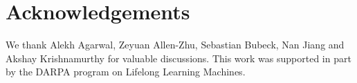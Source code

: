 \documentclass[11pt]{article}
\theoremstyle{definition}
\begin{document}










% 



\section*{Acknowledgements}
We thank Alekh Agarwal, Zeyuan Allen-Zhu, Sebastian Bubeck, Nan Jiang and Akshay Krishnamurthy for valuable discussions.  This work was supported in part by the DARPA program on Lifelong Learning Machines.  




\newpage

\appendix








\end{document}
